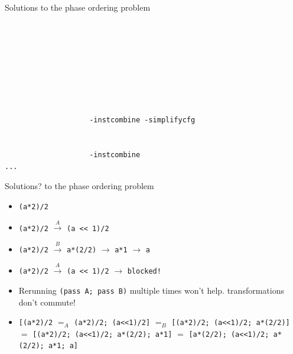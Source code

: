 \documentclass[8pt]{beamer}
\newcommand{\code}[1]{\texttt{#1}}
\begin{document}
\begin{frame}[fragile]{Solutions to the phase ordering problem}
\begin{verbatim}
                                                                    
                                                                       
                                                                     
                                                                        
                                                                              
                                                                       
                                                                       
                                                                
                    -instcombine -simplifycfg                                   
                                                               
                                                                        
                    -instcombine                                           
...
\end{verbatim}
\end{frame}

\begin{frame}[fragile]{Solutions? to the phase ordering problem}
\begin{itemize}
\item \code{(a*2)/2} \pause
\item \code{(a*2)/2} \pause $\xrightarrow{A}$ \code{(a << 1)/2 } \pause
\item \code{(a*2)/2} \pause $\xrightarrow{B}$ \code{a*(2/2)} \pause $\rightarrow$ \code{a*1} \pause $\rightarrow$ \code{a} \pause
\item \code{(a*2)/2} \pause $\xrightarrow{A}$ \code{(a << 1)/2} \pause $\rightarrow$ \texttt{blocked!} \pause
\item Rerunning \texttt{(pass A; pass B)} multiple times won't help. transformations don't commute!
\item \code{[(a*2)/2} \pause $=_A$  \code{(a*2)/2; (a<<1)/2]} \pause $=_B$ \code{[(a*2)/2; (a<<1)/2; a*(2/2)]} \pause $=$ \code{[(a*2)/2; (a<<1)/2; a*(2/2); a*1]} \pause $=$ \code{[a*(2/2); (a<<1)/2; a*(2/2); a*1; a]} 
\end{itemize}
\end{frame}
\end{document}
